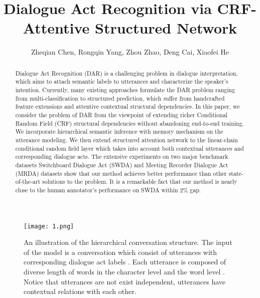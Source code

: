 \documentclass[sigconf]{acmart}
\begin{document}
\title{Dialogue Act Recognition via CRF-Attentive Structured Network}




\author{Zheqian Chen, Rongqin Yang, Zhou Zhao, Deng Cai, Xiaofei He}
\begin{abstract}
Dialogue Act Recognition (DAR) is a challenging problem in dialogue interpretation, which aims to attach semantic labels to utterances and characterize the speaker's intention. Currently, many existing approaches formulate the DAR problem ranging from multi-classification to structured prediction, which suffer from handcrafted feature extensions and attentive contextual structural dependencies. In this paper, we consider the problem of DAR from the viewpoint of extending richer Conditional Random Field (CRF) structural dependencies without abandoning end-to-end training. We incorporate hierarchical semantic inference with memory mechanism on the utterance modeling. We then extend structured attention network to the linear-chain conditional random field layer which takes into account both contextual utterances and corresponding dialogue acts. The extensive experiments on two major benchmark datasets Switchboard Dialogue Act (SWDA) and Meeting Recorder Dialogue Act (MRDA) datasets show that our method achieves better performance than other state-of-the-art solutions to the problem. It is a remarkable fact that our method is nearly close to the human annotator's performance on SWDA within 2\% gap.
\end{abstract}

\maketitle

\begin{figure*}[t]
	\centering
	\texttt{[image: 1.png]}
	\caption{An illustration of the hierarchical conversation structure. The input of the model is a conversation which consist of  utterances  with corresponding dialogue act labels . Each utterance is composed of diverse length of words in the character level  and the word level . Notice that utterances are not exist independent, utterances have contextual relations with each other.}
\end{figure*}
\end{document}
